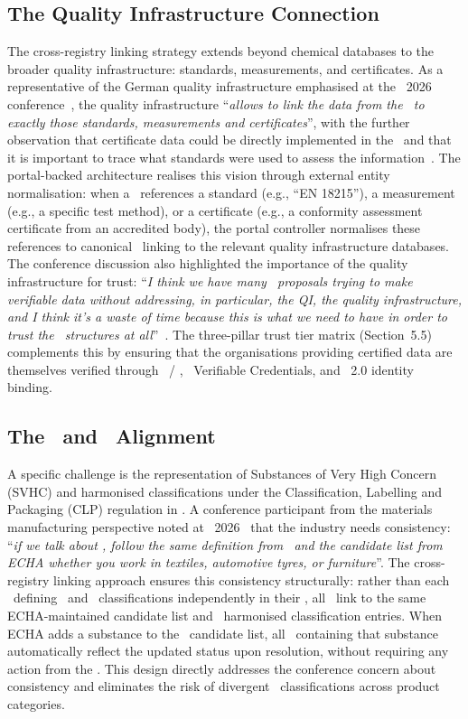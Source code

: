 \subsection{The Quality Infrastructure Connection}

The cross-registry linking strategy extends beyond chemical databases to the
broader quality infrastructure: standards, measurements, and certificates. As a
representative of the German quality infrastructure emphasised at the
\DPPforEU~2026 conference~\cite{dpp4eu2026_day2}, the quality infrastructure
``\textit{allows to link the data from the \DPP\ to exactly those standards,
measurements and certificates}'', with the further observation that certificate
data could be directly implemented in the \DPP\ and that it is important to
trace what standards were used to assess the information~\cite{dpp4eu2026_day2}.
The portal-backed architecture realises this vision through external entity
normalisation: when a \DPP\ references a standard (e.g., ``EN 18215''), a
measurement (e.g., a specific test method), or a certificate (e.g., a conformity
assessment certificate from an accredited body), the portal controller
normalises these references to canonical \IRIs\ linking to the relevant quality
infrastructure databases. The conference discussion also highlighted the
importance of the quality infrastructure for trust: ``\textit{I think we have
many \DPP\ proposals trying to make verifiable data without addressing, in
particular, the QI, the quality infrastructure, and I think it's a waste of time
because this is what we need to have in order to trust the \DPP\ structures at
all}''~\cite{dpp4eu2026_day2}. The three-pillar trust tier matrix (Section~5.5)
complements this by ensuring that the organisations providing certified data are
themselves verified through \EORI\ / \VIES, \WthreeC\ Verifiable Credentials,
and \eIDAS~2.0 identity binding.

\subsection{The \SVHC\ and \CLP\ Alignment}

A specific challenge is the representation of Substances of Very High Concern
(SVHC) and harmonised classifications under the Classification, Labelling and
Packaging (CLP) regulation in \DPPs. A conference participant from the materials
manufacturing perspective noted at \DPPforEU~2026~\cite{dpp4eu2026_day1} that
the industry needs consistency: ``\textit{if we talk about \SVHCs, follow the
same definition from \CLP\ and the candidate list from ECHA whether you work in
textiles, automotive tyres, or furniture}''. The cross-registry linking approach
ensures this consistency structurally: rather than each \REO\ defining \SVHC\
and \CLP\ classifications independently in their \DPPs, all \DPPs\ link to the
same ECHA-maintained candidate list and \CLP\ harmonised classification entries.
When ECHA adds a substance to the \SVHC\ candidate list, all \DPPs\ containing
that substance automatically reflect the updated status upon resolution, without
requiring any action from the \REOs. This design directly addresses the
conference concern about consistency and eliminates the risk of divergent \SVHC\
classifications across product categories.

